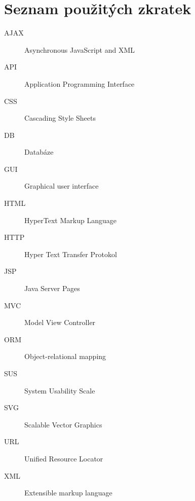 \chapter{Seznam použitých zkratek}
\begin{description}
	\item[AJAX] Asynchronous JavaScript and XML
	\item[API] Application Programming Interface
	\item[CSS] Cascading Style Sheets
	\item[DB] Databáze
	\item[GUI] Graphical user interface
	\item[HTML] HyperText Markup Language
	\item[HTTP] Hyper Text Transfer Protokol
	\item[JSP] Java Server Pages
	\item[MVC] Model View Controller
	\item[ORM] Object-relational mapping
	\item[SUS] System Usability Scale
	\item[SVG] Scalable Vector Graphics
	\item[URL] Unified Resource Locator
	\item[XML] Extensible markup language
\end{description}